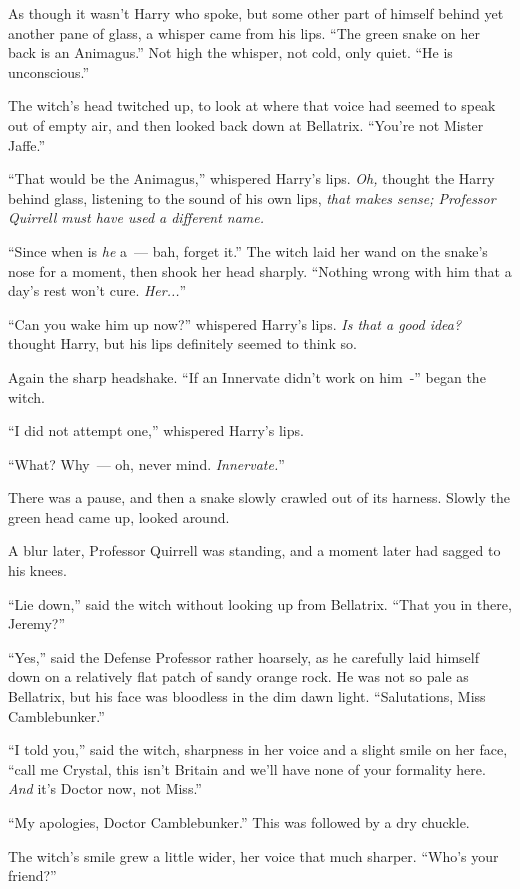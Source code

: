 As though it wasn't Harry who spoke, but some other part of himself behind yet another pane of glass, a whisper came from his lips. ``The green snake on her back is an Animagus.'' Not high the whisper, not cold, only quiet. ``He is unconscious.''

The witch's head twitched up, to look at where that voice had seemed to speak out of empty air, and then looked back down at Bellatrix. ``You're not Mister Jaffe.''

``That would be the Animagus,'' whispered Harry's lips. \emph{Oh,} thought the Harry behind glass, listening to the sound of his own lips, \emph{that makes sense; Professor Quirrell must have used a different name.}

``Since when is \emph{he} a~--- bah, forget it.'' The witch laid her wand on the snake's nose for a moment, then shook her head sharply. ``Nothing wrong with him that a day's rest won't cure. \emph{Her...}''

``Can you wake him up now?'' whispered Harry's lips. \emph{Is that a good idea?} thought Harry, but his lips definitely seemed to think so.

Again the sharp headshake. ``If an Innervate didn't work on him~-'' began the witch.

``I did not attempt one,'' whispered Harry's lips.

``What? Why~--- oh, never mind. \emph{Innervate.}''

There was a pause, and then a snake slowly crawled out of its harness. Slowly the green head came up, looked around.

A blur later, Professor Quirrell was standing, and a moment later had sagged to his knees.

``Lie down,'' said the witch without looking up from Bellatrix. ``That you in there, Jeremy?''

``Yes,'' said the Defense Professor rather hoarsely, as he carefully laid himself down on a relatively flat patch of sandy orange rock. He was not so pale as Bellatrix, but his face was bloodless in the dim dawn light. ``Salutations, Miss Camblebunker.''

``I told you,'' said the witch, sharpness in her voice and a slight smile on her face, ``call me Crystal, this isn't Britain and we'll have none of your formality here. \emph{And} it's Doctor now, not Miss.''

``My apologies, Doctor Camblebunker.'' This was followed by a dry chuckle.

The witch's smile grew a little wider, her voice that much sharper. ``Who's your friend?''

